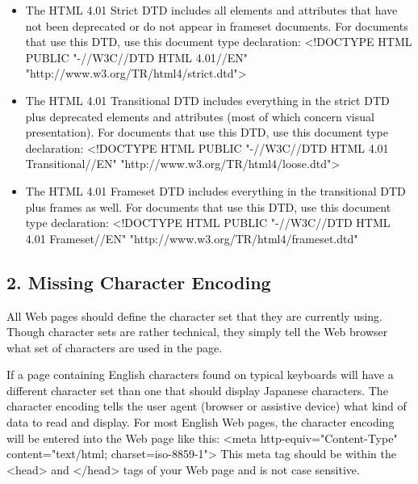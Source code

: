 \documentclass[12pt]{report}
\renewcommand{\_}{\kern-1.5pt\textunderscore\kern-1.5pt}
\begin{document}
\begin{itemize}
	\item \textcolor[HTML]{0D0D0D}{The HTML 4.01 Strict DTD includes all elements and attributes that have not been deprecated or do not appear in frameset documents. For documents that use this DTD, use this document type declaration: <!DOCTYPE HTML PUBLIC "-//W3C//DTD HTML 4.01//EN" "http://www.w3.org/TR/html4/strict.dtd">}\par

	\item \textcolor[HTML]{0D0D0D}{The HTML 4.01 Transitional DTD includes everything in the strict DTD plus deprecated elements and attributes (most of which concern visual presentation). For documents that use this DTD, use this document type declaration: <!DOCTYPE HTML PUBLIC "-//W3C//DTD HTML 4.01 Transitional//EN" "http://www.w3.org/TR/html4/loose.dtd">}\par

	\item \textcolor[HTML]{0D0D0D}{The HTML 4.01 Frameset DTD includes everything in the transitional DTD plus frames as well. For documents that use this DTD, use this document type declaration: <!DOCTYPE HTML PUBLIC "-//W3C//DTD HTML 4.01 Frameset//EN" "http://www.w3.org/TR/html4/frameset.dtd"}
\end{itemize}\par

\begin{adjustwidth}{0.2in}{0.84in}
\subsection*{2. Missing Character Encoding}
\end{adjustwidth}

\begin{adjustwidth}{0.2in}{0.84in}
\textcolor[HTML]{0D0D0D}{All Web pages should define the character set that they are currently using. Though character sets are rather technical, they simply tell the Web browser what set of characters are used in the page.}\par

\end{adjustwidth}

\begin{adjustwidth}{0.2in}{0.84in}
\textcolor[HTML]{0D0D0D}{If a page containing English characters found on typical keyboards will have a different character set than one that should display Japanese characters. The character encoding tells the user agent (browser or assistive device) what kind of data to read and display. For most English Web pages, the character encoding will be entered into the Web page like this: <meta http-equiv="Content-Type" content="text/html; charset=iso-8859-1"> This meta tag should be within the <head> and </head> tags of your Web page and is not case sensitive.}\par

\end{adjustwidth}
\end{document}
